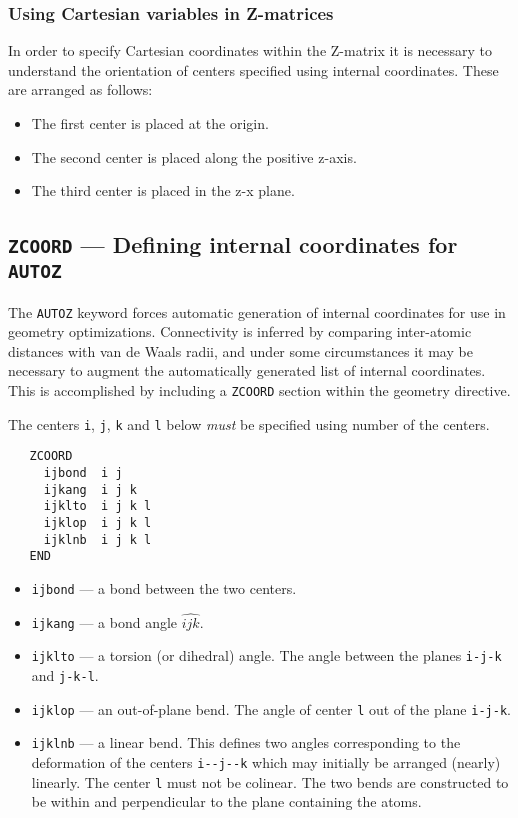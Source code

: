\subsubsection{Using Cartesian variables in Z-matrices}
\label{sec:zmcart}

In order to specify Cartesian coordinates within the Z-matrix it is
necessary to understand the orientation of centers specified using
internal coordinates.  These are arranged as follows:
\begin{itemize}
\item The first center is placed at the origin.
\item The second center is placed along the positive z-axis.
\item The third center is placed in the z-x plane.
\end{itemize}

\subsection{{\tt ZCOORD} --- Defining internal coordinates for {\tt AUTOZ}}
\label{sec:zcoord}

The \verb+AUTOZ+ keyword forces automatic generation of internal
coordinates for use in geometry optimizations.  Connectivity
is inferred by comparing inter-atomic distances with van de Waals
radii, and under some circumstances it may be necessary to augment the
automatically generated list of internal coordinates.  This is
accomplished by including a {\tt ZCOORD} section within the geometry
directive.

The centers \verb+i+, \verb+j+, \verb+k+ and \verb+l+ below {\em must} be
specified using number of the centers.
\begin{verbatim}
   ZCOORD
     ijbond  i j
     ijkang  i j k
     ijklto  i j k l
     ijklop  i j k l
     ijklnb  i j k l
   END
\end{verbatim}

\begin{itemize}
\item {\tt ijbond} --- a bond between the two centers.
\item {\tt ijkang} --- a bond angle $\widehat{ijk}$.
\item {\tt ijklto} --- a torsion (or dihedral) angle.  The
  angle between the planes \verb+i-j-k+ and \verb+j-k-l+.
\item {\tt ijklop} --- an out-of-plane bend.  The angle of center
  \verb+l+ out of the plane \verb+i-j-k+.
\item {\tt ijklnb} --- a linear bend.  This defines two angles
  corresponding to the deformation of the centers \verb+i--j--k+ 
  which may initially be arranged (nearly) linearly.  The center
  \verb+l+ must not be colinear.  The two bends are constructed to be
  within and perpendicular to the plane containing the atoms.
\end{itemize}   

